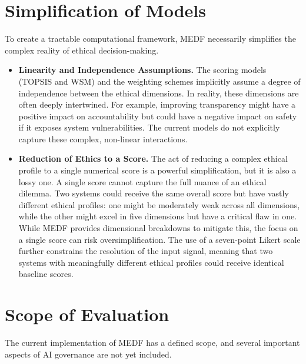 \section{Simplification of Models}
\label{sec:simplification}

To create a tractable computational framework, MEDF necessarily simplifies the complex reality of ethical decision-making.

\begin{itemize}[leftmargin=2em]
  \item \textbf{Linearity and Independence Assumptions.} The scoring models (TOPSIS and WSM) and the weighting schemes implicitly assume a degree of independence between the ethical dimensions. In reality, these dimensions are often deeply intertwined. For example, improving transparency might have a positive impact on accountability but could have a negative impact on safety if it exposes system vulnerabilities. The current models do not explicitly capture these complex, non-linear interactions.

  \item \textbf{Reduction of Ethics to a Score.} The act of reducing a complex ethical profile to a single numerical score is a powerful simplification, but it is also a lossy one. A single score cannot capture the full nuance of an ethical dilemma. Two systems could receive the same overall score but have vastly different ethical profiles: one might be moderately weak across all dimensions, while the other might excel in five dimensions but have a critical flaw in one. While MEDF provides dimensional breakdowns to mitigate this, the focus on a single score can risk oversimplification. The use of a seven-point Likert scale further constrains the resolution of the input signal, meaning that two systems with meaningfully different ethical profiles could receive identical baseline scores.
\end{itemize}

\section{Scope of Evaluation}
\label{sec:scope}

The current implementation of MEDF has a defined scope, and several important aspects of AI governance are not yet included.

